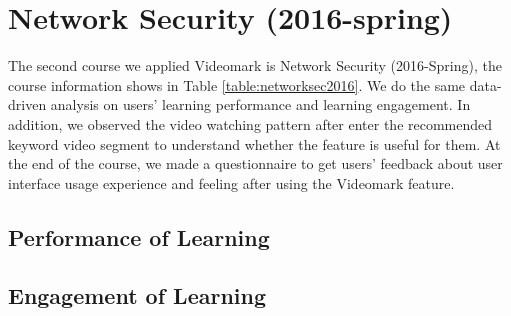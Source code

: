 \section{Network Security (2016-spring)}
The second course we applied Videomark is Network Security (2016-Spring), the course information shows in Table \ref{table:networksec2016}.
We do the same data-driven analysis on users' learning performance and learning engagement.
In addition, we observed the video watching pattern after enter the recommended keyword video segment to understand whether the feature is useful for them.
At the end of the course, we made a questionnaire to get users' feedback about user interface usage experience and feeling after using the Videomark feature.

\begin{table}[H]
\centering
\caption{Base Information of Network Security}
\label{table:networksec2016}
\end{table}

\subsection{Performance of Learning}
\subsection{Engagement of Learning}
\begin{table}[H]
\centering
\caption{Comparison User's Learning Engagement}
\label{table:securityactivitycompare}
\end{table}
